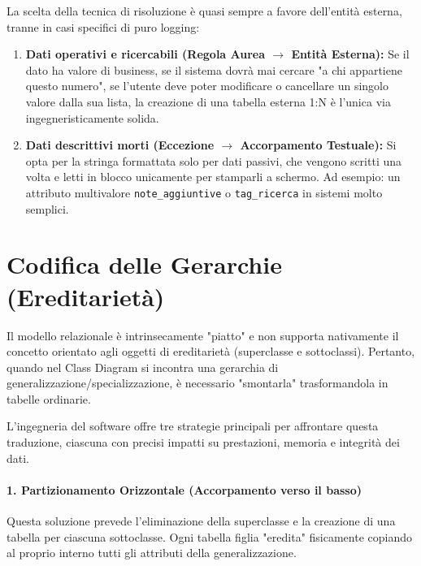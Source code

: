 \begin{tip}
La scelta della tecnica di risoluzione è quasi sempre a favore dell'entità esterna, tranne in casi specifici di puro logging:
\begin{enumerate}
    \item \textbf{Dati operativi e ricercabili (Regola Aurea $\rightarrow$ Entità Esterna):} Se il dato ha valore di business, se il sistema dovrà mai cercare "a chi appartiene questo numero", se l'utente deve poter modificare o cancellare un singolo valore dalla sua lista, la creazione di una tabella esterna 1:N è l'unica via ingegneristicamente solida.
    \item \textbf{Dati descrittivi morti (Eccezione $\rightarrow$ Accorpamento Testuale):} Si opta per la stringa formattata solo per dati passivi, che vengono scritti una volta e letti in blocco unicamente per stamparli a schermo. Ad esempio: un attributo multivalore \texttt{note\_aggiuntive} o \texttt{tag\_ricerca} in sistemi molto semplici. 
\end{enumerate}
\end{tip}

\section{Codifica delle Gerarchie (Ereditarietà)}

Il modello relazionale è intrinsecamente "piatto" e non supporta nativamente il concetto orientato agli oggetti di ereditarietà (superclasse e sottoclassi). Pertanto, quando nel Class Diagram si incontra una gerarchia di generalizzazione/specializzazione, è necessario "smontarla" trasformandola in tabelle ordinarie. 

L'ingegneria del software offre tre strategie principali per affrontare questa traduzione, ciascuna con precisi impatti su prestazioni, memoria e integrità dei dati.

\paragraph{1. Partizionamento Orizzontale (Accorpamento verso il basso)}
Questa soluzione prevede l'eliminazione della superclasse e la creazione di una tabella per ciascuna sottoclasse. Ogni tabella figlia "eredita" fisicamente copiando al proprio interno tutti gli attributi della generalizzazione.

